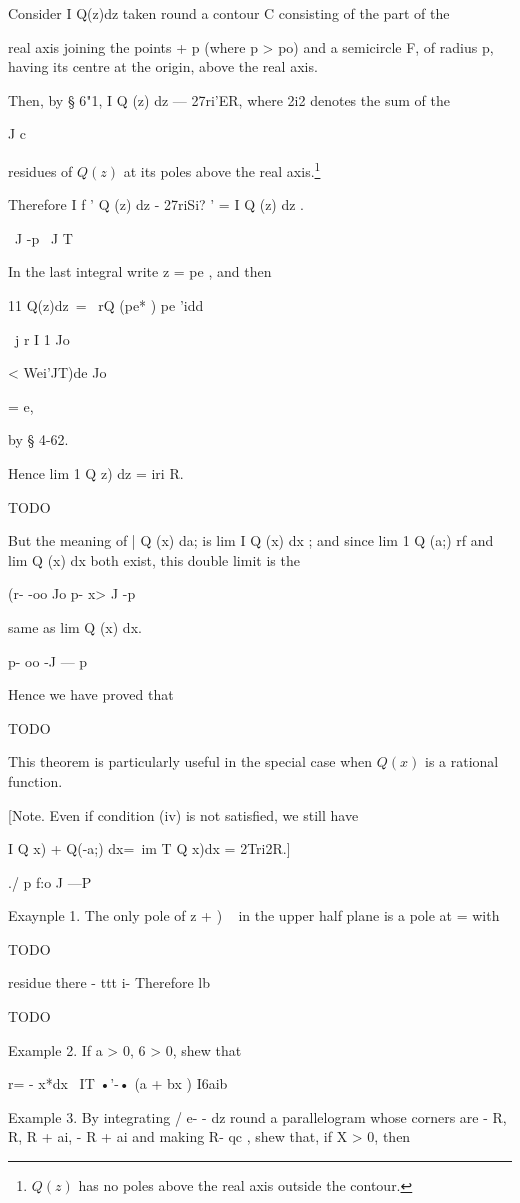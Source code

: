 Consider I Q(z)dz taken round a contour C consisting of the part of
the

real axis joining the points + p (where p > po) and a semicircle F, of
radius p, having its centre at the origin, above the real axis.

Then, by § 6"1, I Q (z) dz — 27ri'ER, where 2i2 denotes the sum of the

J c

residues of $Q(z)$ at its poles above the real axis.\footnote{$Q(z)$ has
  no poles above the real axis outside the contour.}

%
%
Therefore I f ' Q (z) dz - 27riSi? ' = I Q (z) dz .

\ J -p \ J T

In the last integral write z = pe , and then

11 Q(z)dz\ = \ rQ (pe* ) pe 'idd

\ j r I 1 Jo

< Wei'JT)de Jo

= e,

by § 4-62.

Hence lim 1 Q z) dz = iri R.

TODO

But the meaning of | Q (x) da; is lim I Q (x) dx ; and since lim 1 Q
(a;) rf and lim Q (x) dx both exist, this double limit is the

(r- -oo Jo p- x> J -p

same as lim Q (x) dx.

p- oo -J — p

Hence we have proved that

TODO

This theorem is particularly useful in the special case when $Q(x)$ is a
rational function.

[Note. Even if condition (iv) is not satisfied, we still have

I Q x) + Q(-a;) dx=\ im T Q x)dx = 2Tri2R.]

./ p f:o J —P

Exaynple 1. The only pole of z + ) ~ in the upper half plane is a pole
at = with

TODO

residue there - ttt i- Therefore lb

TODO

Example 2. If a > 0, 6 > 0, shew that

r= - x*dx \ IT •'-• (a + bx ) I6aib

Example 3. By integrating / e- - dz round a parallelogram whose
corners are - R, R, R + ai, - R + ai and making R- qc , shew that, if
X > 0, then

